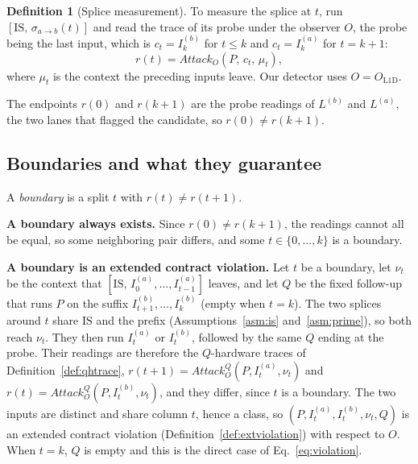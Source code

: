 \documentclass[letterpaper,twocolumn,10pt]{article}
\theoremstyle{definition}
\newtheorem{definition}{Definition}
\providecommand{\IS}{\ensuremath{\mathrm{IS}}}
\providecommand{\obs}{\ensuremath{O}}
\providecommand{\ol}{\ensuremath{O_{\mathrm{L1D}}}}
\providecommand{\At}[1]{\ensuremath{\mathit{Attack}_{#1}}}
\providecommand{\AQ}[1]{\ensuremath{\mathit{Attack}^{Q}_{#1}}}
\providecommand{\lane}[1]{\ensuremath{L^{(#1)}}}
\providecommand{\inp}[2]{\ensuremath{I_{#1}^{(#2)}}}
\providecommand{\batch}[1]{\ensuremath{[\IS,\,#1]}}
\providecommand{\spl}[1]{\ensuremath{\sigma_{a\to b}(#1)}}
\begin{document}
\begin{definition}[Splice measurement]
\label{def:measure}
To measure the splice at $t$, run $\batch{\spl{t}}$ and read the trace of its probe under the observer
$\obs$, the probe being the last input, which is $c_t=\inp{k}{b}$ for $t\le k$ and $c_t=\inp{k}{a}$ for $t=k+1$:
\begin{equation}
r(t)=\At{\obs}(P,\,c_t,\,\mu_t),
\label{eq:rt}
\end{equation}
where $\mu_t$ is the context the preceding inputs leave. Our detector uses $\obs=\ol$.
\end{definition}

The endpoints $r(0)$ and $r(k+1)$ are the probe readings of $\lane{b}$ and $\lane{a}$, the two lanes
that flagged the candidate, so $r(0)\neq r(k+1)$.

\subsection{Boundaries and what they guarantee}
\label{sec:detect-soundness}

A \emph{boundary} is a split $t$ with $r(t)\neq r(t+1)$.

\textbf{A boundary always exists.} Since $r(0)\neq r(k+1)$, the readings cannot all be equal, so
some neighboring pair differs, and some $t\in\{0,\dots,k\}$ is a boundary.

\textbf{A boundary is an extended contract violation.} Let $t$ be a boundary, let $\nu_t$ be the context
that $\batch{\inp{0}{a},\dots,\inp{t-1}{a}}$ leaves, and let $Q$ be the fixed follow-up that runs
$P$ on the suffix $\inp{t+1}{b},\dots,\inp{k}{b}$ (empty when $t=k$). The two splices around $t$
share $\IS$ and the prefix (Assumptions~\ref{asm:is} and~\ref{asm:prime}), so both reach $\nu_t$. They then run
$\inp{t}{a}$ or $\inp{t}{b}$, followed by the same $Q$ ending at the probe. Their readings are
therefore the $Q$-hardware traces of Definition~\ref{def:qhtrace},
$r(t+1)=\AQ{\obs}(P,\inp{t}{a},\nu_t)$ and $r(t)=\AQ{\obs}(P,\inp{t}{b},\nu_t)$, and they differ,
since $t$ is a boundary. The two inputs are distinct and share column $t$, hence a class, so
$(P,\inp{t}{a},\inp{t}{b},\nu_t,Q)$ is an extended contract violation
(Definition~\ref{def:extviolation}) with respect to $\obs$. When $t=k$, $Q$ is empty and this is
the direct case of Eq.~\eqref{eq:violation}.
\end{document}
